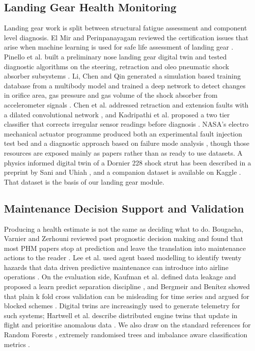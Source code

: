 \documentclass[conference]{IEEEtran}
\begin{document}
\subsection{Landing Gear Health Monitoring}
Landing gear work is split between structural fatigue assessment and component level diagnosis. El Mir and Perinpanayagam reviewed the certification issues that arise when machine learning is used for safe life assessment of landing gear \cite{b45}. Pinello et al. built a preliminary nose landing gear digital twin and tested diagnostic algorithms on the steering, retraction and oleo pneumatic shock absorber subsystems \cite{b41}. Li, Chen and Qin generated a simulation based training database from a multibody model and trained a deep network to detect changes in orifice area, gas pressure and gas volume of the shock absorber from accelerometer signals \cite{b42}. Chen et al. addressed retraction and extension faults with a dilated convolutional network \cite{b43}, and Kadripathi et al. proposed a two tier classifier that corrects irregular sensor readings before diagnosis \cite{b44}. NASA's electro mechanical actuator programme produced both an experimental fault injection test bed \cite{b46} and a diagnostic approach based on failure mode analysis \cite{b47}, though those resources are exposed mainly as papers rather than as ready to use datasets. A physics informed digital twin of a Dornier 228 shock strut has been described in a preprint by Sani and Uhiah \cite{b40}, and a companion dataset is available on Kaggle \cite{b39}. That dataset is the basis of our landing gear module.

\subsection{Maintenance Decision Support and Validation}
Producing a health estimate is not the same as deciding what to do. Bougacha, Varnier and Zerhouni reviewed post prognostic decision making and found that most PHM papers stop at prediction and leave the translation into maintenance actions to the reader \cite{b50}. Lee et al. used agent based modelling to identify twenty hazards that data driven predictive maintenance can introduce into airline operations \cite{b57}. On the evaluation side, Kaufman et al. defined data leakage and proposed a learn predict separation discipline \cite{b52}, and Bergmeir and Ben\'itez showed that plain k fold cross validation can be misleading for time series and argued for blocked schemes \cite{b53}. Digital twins are increasingly used to generate telemetry for such systems; Hartwell et al. describe distributed engine twins that update in flight and prioritise anomalous data \cite{b51}. We also draw on the standard references for Random Forests \cite{b54}, extremely randomised trees \cite{b55} and imbalance aware classification metrics \cite{b56}.
\end{document}
